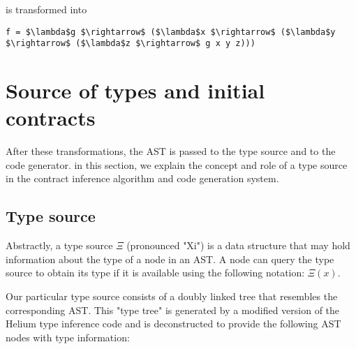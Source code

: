 \documentclass[10pt]{report}
\begin{document}
is transformed into

\begin{lstlisting}[caption=Result of lambda argument expansion transformation.,mathescape]
f = $\lambda$g $\rightarrow$ ($\lambda$x $\rightarrow$ ($\lambda$y $\rightarrow$ ($\lambda$z $\rightarrow$ g x y z)))
\end{lstlisting}

\section{Source of types and initial contracts}
\label{sourceoftypes}
After these transformations, the AST is passed to the type source and to the code generator.
in this section, we explain the concept and role of a type source in the contract inference algorithm and code generation system.

\subsection{Type source}


Abstractly, a type source $\Xi$ (pronounced "Xi") is a data structure that may hold information about the type of a node in an AST.
A node can query the type source to obtain its type if it is available using the following notation: $\Xi( x )$.

Our particular type source consists of a doubly linked tree that resembles the corresponding AST.
This "type tree" is generated by a modified version of the Helium type inference code and is deconstructed to provide the following AST nodes with type information:
\end{document}

